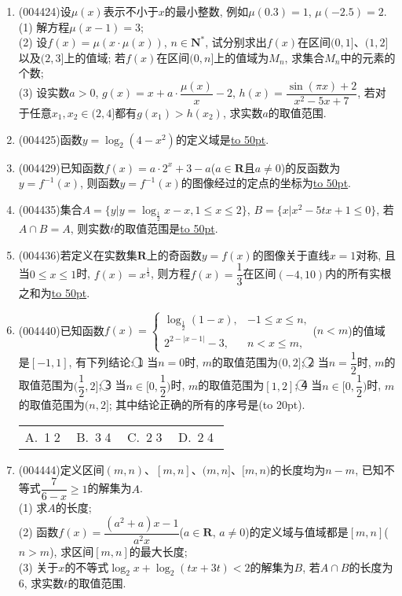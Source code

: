 \documentclass[10pt,a4paper]{article}
\newcommand{\blank}[1]{\underline{\hbox to #1pt{}}}
\newcommand{\bracket}[1]{(\hbox to #1pt{})}
\newcommand{\fourch}[4]{\par\begin{tabular}{p{.23\textwidth}p{.23\textwidth}p{.23\textwidth}p{.23\textwidth}}
A.~#1 &B.~#2& C.~#3& D.~#4
\end{tabular}}
\begin{document}
\begin{enumerate}[1.]
\item {\tiny (004424)}设$\mu (x)$表示不小于$x$的最小整数, 例如$\mu(0.3)=1$, $\mu(-2.5)=2$.\\
(1) 解方程$\mu(x-1)=3$;\\
(2) 设$f(x)=\mu (x\cdot \mu (x))$, $n\in \mathbf{N}^*$, 试分别求出$f(x)$在区间$(0,1]$、$(1,2]$以及$(2,3]$上的值域; 若$f(x)$在区间$(0,n]$上的值域为$M_n$, 求集合$M_n$中的元素的个数;\\
(3) 设实数$a>0$, $g(x)=x+a\cdot \dfrac{\mu (x)}x-2$, $h(x)=\dfrac{\sin (\pi x)+2}{x^2-5x+7}$, 若对于任意$x_1,x_2\in (2,4]$都有$g(x_1)>h(x_2)$, 求实数$a$的取值范围.
\item {\tiny (004425)}函数$y=\log_2(4-x^2)$的定义域是\blank{50}.
\item {\tiny (004429)}已知函数$f(x)=a\cdot 2^x+3-a$($a\in \mathbf{R}$且$a\ne 0$)的反函数为$y=f^{-1}(x)$, 则函数$y=f^{-1}(x)$的图像经过的定点的坐标为\blank{50}.
\item {\tiny (004435)}集合$A=\{y|y=\log_{\frac 12}x-x,1\le x\le 2\}$, $B=\{x|x^2-5tx+1\le 0\}$, 若$A\cap B=A$, 则实数$t$的取值范围是\blank{50}.
\item {\tiny (004436)}若定义在实数集$\mathbf{R}$上的奇函数$y=f(x)$的图像关于直线$x=1$对称, 且当$0\le x\le 1$时, $f(x)=x^{\frac 13}$, 则方程$f(x)=\dfrac 13$在区间$(-4,10)$内的所有实根之和为\blank{50}.
\item {\tiny (004440)}已知函数$f(x)=\begin{cases}\log_{\frac 12}(1-x), & -1\le x\le n,  \\ 2^{2-|x-1|}-3, & n<x\le m,  \end{cases}$($n<m$)的值域是$[-1,1]$, 有下列结论:
\textcircled{1} 当$n=0$时, $m$的取值范围为$(0,2]$; \textcircled{2}  当$n=\dfrac 12$时, $m$的取值范围为$(\dfrac 12,2]$; \textcircled{3}  当$n\in [0,\dfrac 12)$时, $m$的取值范围为$[1,2]$; \textcircled{4}  当$n\in [0,\dfrac 12)$时, $m$的取值范围为$(n,2]$;
其中结论正确的所有的序号是\bracket{20}.
\fourch{\textcircled{1}\textcircled{2}}{\textcircled{3}\textcircled{4}}{\textcircled{2}\textcircled{3}}{\textcircled{2}\textcircled{4}}
\item {\tiny (004444)}定义区间$(m,n)$、$[m,n]$、$(m,n]$、$[m,n)$的长度均为$n-m$, 已知不等式$\dfrac 7{6-x}\ge 1$的解集为$A$.\\
(1) 求$A$的长度;\\
(2) 函数$f(x)=\dfrac{(a^2+a)x-1}{a^2x}$($a\in \mathbf{R}$, $a\ne 0$)的定义域与值域都是$[m,n]$($n>m$), 求区间$[m,n]$的最大长度;\\
(3) 关于$x$的不等式$\log_2x+\log_2(tx+3t)<2$的解集为$B$, 若$A\cap B$的长度为$6$, 求实数$t$的取值范围.

\end{enumerate}
\end{document}
